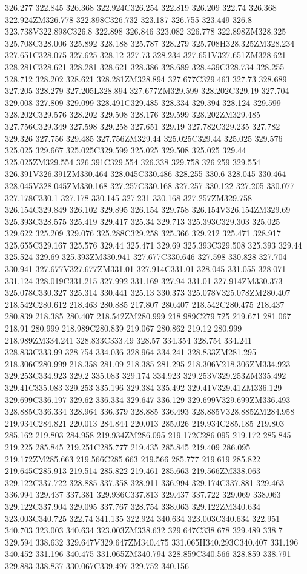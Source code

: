 326.277 322.845 326.368 322.924C326.254 322.819 326.209 322.74 326.368 322.924ZM326.778 322.898C326.732 323.187 326.755 323.449 326.8 323.738V322.898C326.8 322.898 326.846 323.082 326.778 322.898ZM328.325 325.708C328.006 325.892 328.188 325.787 328.279 325.708H328.325ZM328.234 327.651C328.075 327.625 328.12 327.73 328.234 327.651V327.651ZM328.621 328.281C328.621 328.281 328.621 328.386 328.689 328.439C328.734 328.255 328.712 328.202 328.621 328.281ZM328.894 327.677C329.463 327.73 328.689 327.205 328.279 327.205L328.894 327.677ZM329.599 328.202C329.19 327.704 329.008 327.809 329.099 328.491C329.485 328.334 329.394 328.124 329.599 328.202C329.576 328.202 329.508 328.176 329.599 328.202ZM329.485 327.756C329.349 327.598 329.258 327.651 329.19 327.782C329.235 327.782 329.326 327.756 329.485 327.756ZM329.44 325.025C329.44 325.025 329.576 325.025 329.667 325.025C329.599 325.025 329.508 325.025 329.44 325.025ZM329.554 326.391C329.554 326.338 329.758 326.259 329.554 326.391V326.391ZM330.464 328.045C330.486 328.255 330.6 328.045 330.464 328.045V328.045ZM330.168 327.257C330.168 327.257 330.122 327.205 330.077 327.178C330.1 327.178 330.145 327.231 330.168 327.257ZM329.758 326.154C329.849 326.102 329.895 326.154 329.758 326.154V326.154ZM329.69 325.393C328.575 325.419 329.417 325.34 329.713 325.393C329.303 325.025 329.622 325.209 329.076 325.288C329.258 325.366 329.212 325.471 328.917 325.655C329.167 325.576 329.44 325.471 329.69 325.393C329.508 325.393 329.44 325.524 329.69 325.393ZM330.941 327.677C330.646 327.598 330.828 327.704 330.941 327.677V327.677ZM331.01 327.914C331.01 328.045 331.055 328.071 331.124 328.019C331.215 327.992 331.169 327.94 331.01 327.914ZM330.373 325.078C330.327 325.314 330.441 325.13 330.373 325.078V325.078ZM280.407 218.542C280.612 218.463 280.885 217.807 280.407 218.542C280.475 218.437 280.839 218.385 280.407 218.542ZM280.999 218.989C279.725 219.671 281.067 218.91 280.999 218.989C280.839 219.067 280.862 219.12 280.999 218.989ZM334.241 328.833C333.49 328.57 334.354 328.754 334.241 328.833C333.99 328.754 334.036 328.964 334.241 328.833ZM281.295 218.306C280.999 218.358 281.09 218.385 281.295 218.306V218.306ZM334.923 329.253C334.923 329.2 335.083 329.174 334.923 329.253V329.253ZM335.492 329.41C335.083 329.253 335.196 329.384 335.492 329.41V329.41ZM336.129 329.699C336.197 329.62 336.334 329.647 336.129 329.699V329.699ZM336.493 328.885C336.334 328.964 336.379 328.885 336.493 328.885V328.885ZM284.958 219.934C284.821 220.013 284.844 220.013 285.026 219.934C285.185 219.803 285.162 219.803 284.958 219.934ZM286.095 219.172C286.095 219.172 285.845 219.225 285.845 219.251C285.777 219.435 285.845 219.409 286.095 219.172ZM285.663 219.566C285.663 219.566 285.777 219.619 285.822 219.645C285.913 219.514 285.822 219.461 285.663 219.566ZM338.063 329.122C337.722 328.885 337.358 328.911 336.994 329.174C337.881 329.463 336.994 329.437 337.381 329.936C337.813 329.437 337.722 329.069 338.063 329.122C337.904 329.095 337.767 328.754 338.063 329.122ZM340.634 323.003C340.725 322.74 341.135 322.924 340.634 323.003C340.634 322.951 340.703 323.003 340.634 323.003ZM338.632 329.647C338.678 329.489 338.7 329.594 338.632 329.647V329.647ZM340.475 331.065H340.293C340.407 331.196 340.452 331.196 340.475 331.065ZM340.794 328.859C340.566 328.859 338.791 329.883 338.837 330.067C339.497 329.752 340.156 